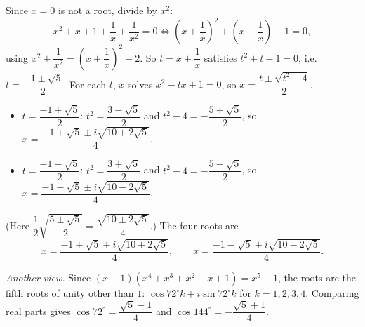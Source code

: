 Since $x=0$ is not a root, divide by $x^2$:
\[x^2+x+1+\dfrac1x+\dfrac1{x^2}=0\iff\left(x+\dfrac1x\right)^2+\left(x+\dfrac1x\right)-1=0,\]
using $x^2+\dfrac1{x^2}=\left(x+\dfrac1x\right)^2-2$. So $t=x+\dfrac1x$ satisfies $t^2+t-1=0$, i.e. $t=\dfrac{-1\pm\sqrt5}{2}$. For each $t$, $x$ solves $x^2-tx+1=0$, so $x=\dfrac{t\pm\sqrt{t^2-4}}{2}$.
\begin{itemize}
\item $t=\dfrac{-1+\sqrt5}{2}$: $t^2=\dfrac{3-\sqrt5}{2}$ and $t^2-4=-\dfrac{5+\sqrt5}{2}$, so $x=\dfrac{-1+\sqrt5\pm i\sqrt{10+2\sqrt5}}{4}$.
\item $t=\dfrac{-1-\sqrt5}{2}$: $t^2=\dfrac{3+\sqrt5}{2}$ and $t^2-4=-\dfrac{5-\sqrt5}{2}$, so $x=\dfrac{-1-\sqrt5\pm i\sqrt{10-2\sqrt5}}{4}$.
\end{itemize}
(Here $\dfrac12\sqrt{\dfrac{5\pm\sqrt5}{2}}=\dfrac{\sqrt{10\pm2\sqrt5}}{4}$.) The four roots are
\[\boxed{x=\dfrac{-1+\sqrt5\pm i\sqrt{10+2\sqrt5}}{4},\qquad x=\dfrac{-1-\sqrt5\pm i\sqrt{10-2\sqrt5}}{4}}.\]

\emph{Another view.} Since $(x-1)\left(x^4+x^3+x^2+x+1\right)=x^5-1$, the roots are the fifth roots of unity other than $1$: $\cos72^\circ k+i\sin72^\circ k$ for $k=1,2,3,4$. Comparing real parts gives $\cos72^\circ=\dfrac{\sqrt5-1}{4}$ and $\cos144^\circ=-\dfrac{\sqrt5+1}{4}$.
